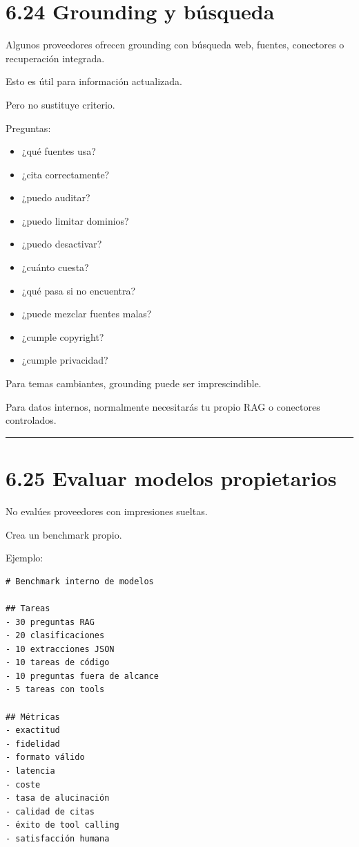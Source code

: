 \section{6.24 Grounding y búsqueda}\label{grounding-y-buxfasqueda}

Algunos proveedores ofrecen grounding con búsqueda web, fuentes,
conectores o recuperación integrada.

Esto es útil para información actualizada.

Pero no sustituye criterio.

Preguntas:

\begin{itemize}
\tightlist
\item
  ¿qué fuentes usa?
\item
  ¿cita correctamente?
\item
  ¿puedo auditar?
\item
  ¿puedo limitar dominios?
\item
  ¿puedo desactivar?
\item
  ¿cuánto cuesta?
\item
  ¿qué pasa si no encuentra?
\item
  ¿puede mezclar fuentes malas?
\item
  ¿cumple copyright?
\item
  ¿cumple privacidad?
\end{itemize}

Para temas cambiantes, grounding puede ser imprescindible.

Para datos internos, normalmente necesitarás tu propio RAG o conectores
controlados.

\begin{center}\rule{0.5\linewidth}{0.5pt}\end{center}

\section{6.25 Evaluar modelos
propietarios}\label{evaluar-modelos-propietarios}

No evalúes proveedores con impresiones sueltas.

Crea un benchmark propio.

Ejemplo:

\begin{lstlisting}
# Benchmark interno de modelos

## Tareas
- 30 preguntas RAG
- 20 clasificaciones
- 10 extracciones JSON
- 10 tareas de código
- 10 preguntas fuera de alcance
- 5 tareas con tools

## Métricas
- exactitud
- fidelidad
- formato válido
- latencia
- coste
- tasa de alucinación
- calidad de citas
- éxito de tool calling
- satisfacción humana
\end{lstlisting}

